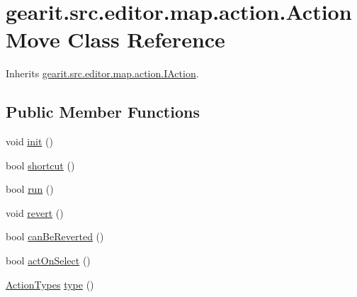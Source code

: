 \hypertarget{classgearit_1_1src_1_1editor_1_1map_1_1action_1_1_action_move}{\section{gearit.\+src.\+editor.\+map.\+action.\+Action\+Move Class Reference}
\label{classgearit_1_1src_1_1editor_1_1map_1_1action_1_1_action_move}
}


Inherits \hyperlink{interfacegearit_1_1src_1_1editor_1_1map_1_1action_1_1_i_action}{gearit.\+src.\+editor.\+map.\+action.\+I\+Action}.

\subsection*{Public Member Functions}
\begin{DoxyCompactItemize}
\item 
void \hyperlink{classgearit_1_1src_1_1editor_1_1map_1_1action_1_1_action_move_a59c789fa289e078ee23bca05d2be9e9b}{init} ()
\item 
bool \hyperlink{classgearit_1_1src_1_1editor_1_1map_1_1action_1_1_action_move_aca2075b4dfee7a38d4387b92e3ea3c52}{shortcut} ()
\item 
bool \hyperlink{classgearit_1_1src_1_1editor_1_1map_1_1action_1_1_action_move_a7eb28623c22279e8519d6254c686878a}{run} ()
\item 
void \hyperlink{classgearit_1_1src_1_1editor_1_1map_1_1action_1_1_action_move_a857e26da342913d986c1c3ddc0a5119a}{revert} ()
\item 
bool \hyperlink{classgearit_1_1src_1_1editor_1_1map_1_1action_1_1_action_move_ac01e4be878f7210aea3a36aecc574707}{can\+Be\+Reverted} ()
\item 
bool \hyperlink{classgearit_1_1src_1_1editor_1_1map_1_1action_1_1_action_move_a1a505f0f066c925e8ed4fc06c625ac97}{act\+On\+Select} ()
\item 
\hyperlink{namespacegearit_1_1src_1_1editor_1_1map_1_1action_af036712a7d960b13d1e31954e65c00e3}{Action\+Types} \hyperlink{classgearit_1_1src_1_1editor_1_1map_1_1action_1_1_action_move_af897d68dc8aec9454372f83c6ffac69e}{type} ()
\end{DoxyCompactItemize}


